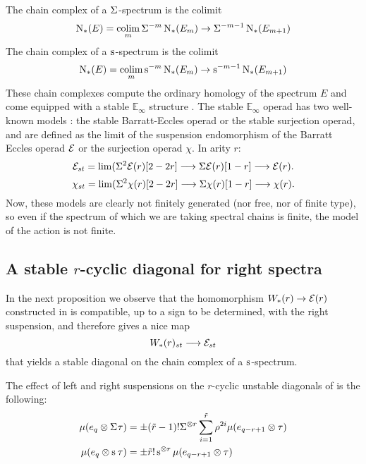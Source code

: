 The chain complex of a $\Sigma^{}$-spectrum is the colimit
\[
 \operatorname{N}_{*}(E) = \operatorname*{colim}_m \Sigma^{-m} \operatorname{N}_{*}(E_m) \to \Sigma^{-m-1} \operatorname{N}_{*}(E_{m+1})
\]
The chain complex of a $\operatorname{s}^{}$-spectrum is the colimit
\[
 \operatorname{N}_{*}(E) = \operatorname*{colim}_m \operatorname{s}^{-m} \operatorname{N}_{*}(E_m) \to \operatorname{s}^{-m-1} \operatorname{N}_{*}(E_{m+1})
\]
These chain complexes compute the ordinary homology of the spectrum $E$ and come equipped with a stable $\mathbb{E}_\infty$ structure \cite{Gill2020}. The stable $\mathbb{E}_\infty$ operad has two well-known models \cite[Appendix]{berger2004combinatorial}: the stable Barratt-Eccles operad or the stable surjection operad, and are defined as the limit of the suspension endomorphism of the Barratt Eccles operad $\mathcal{E}$ or the surjection operad $\chi$. In arity $r$:
\[\mathcal{E}_{st} = \lim( \Sigma^2\mathcal{E}(r)[2-2r] \longrightarrow \Sigma \mathcal{E}(r)[1-r] \longrightarrow \mathcal{E}(r).\]
\[\chi_{st} = \lim( \Sigma^2\chi(r)[2-2r] \longrightarrow \Sigma \chi(r)[1-r] \longrightarrow \chi(r).\]
Now, these models are clearly not finitely generated (nor free, nor of finite type), so even if the spectrum of which we are taking spectral chains is finite, the model of the action is not finite. 

\subsection{A stable $r$-cyclic diagonal for right spectra} In the next proposition we observe that the homomorphism $W_*(r) \to \mathcal{E}(r)$ constructed in \cite{medina2021may_st} is compatible, up to a sign to be determined, with the right suspension, and therefore gives a nice map
\[
 W_*(r)_{st} \longrightarrow \mathcal{E}_{st}
\]
that yields a stable diagonal on the chain complex of a $\operatorname{s}^{}$-spectrum.

\begin{proposition}\label{prop:suspensionunstable}
 The effect of left and right suspensions on the $r$-cyclic unstable diagonals of \cite{medina2021may_st} is the following:
 \begin{align*}
 \mu(e_q \otimes \Sigma^{} \tau) &= \pm (\tilde{r}-1)!\Sigma^{\otimes r}\sum_{i=1}^{\tilde{r}} \rho^{2i}\mu(e_{q-r+1} \otimes \tau)
 \\
 \mu(e_q \otimes \operatorname{s}^{}\tau) &= \pm \tilde{r}!\operatorname{s}^{\otimes r}\mu(e_{q-r+1} \otimes \tau)
 \end{align*}
\end{proposition}

